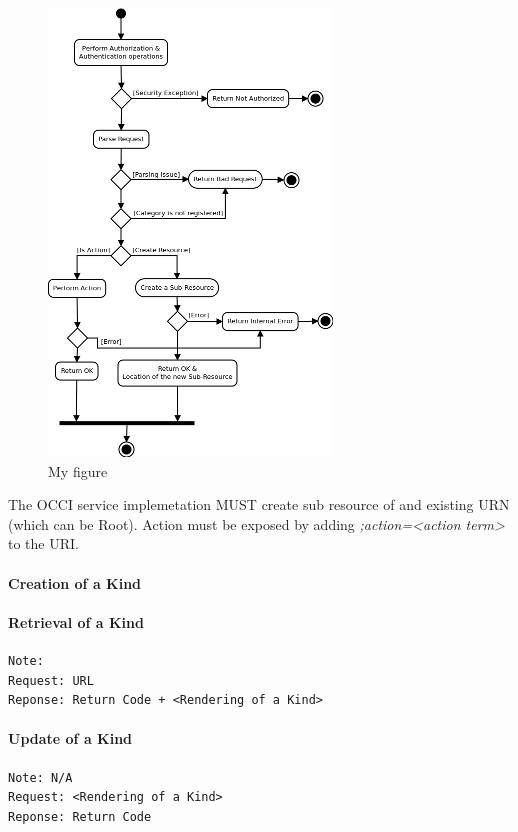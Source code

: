 \documentclass[10pt,a4paper]{article}
\begin{document}
\begin{figure}[!h]
\centering
\includegraphics{POST_operation.png}
\caption{My figure}
\label{the-label-for-cross-referencing}
\end{figure}

The OCCI service implemetation MUST create sub resource of and existing URN (which can be Root). Action must be exposed by adding \emph{;action=<action term>} to the URI.


\paragraph{Creation of a Kind}

\paragraph{Retrieval of a Kind}
\begin{verbatim}
Note: 
Request: URL
Reponse: Return Code + <Rendering of a Kind>
\end{verbatim}

\paragraph{Update of a Kind}
\begin{verbatim}
Note: N/A
Request: <Rendering of a Kind>
Reponse: Return Code
\end{verbatim}
\end{document}
